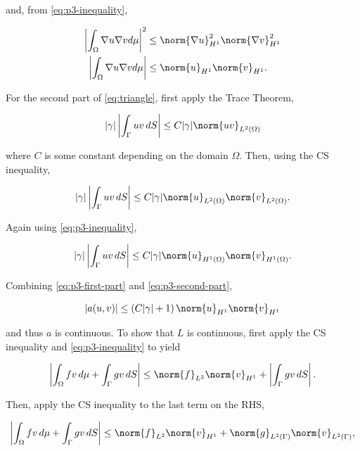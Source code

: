 \documentclass{hw-template}
\newcommand{\intOm}{\int_{\Omega}}
\newcommand{\hOne}{{H^1}}
\newcommand{\ltwo}{{L^2}}
\begin{document}
and, from \autoref{eq:p3-inequality},

\begin{align}
    \left|\intOm \nabla u \nabla v d\mu  \right|^2 &\leq \norm{\nabla u }^2_\hOne \norm{\nabla v}^2_\hOne\\
    \left|\intOm \nabla u \nabla v d\mu  \right| &\leq \norm{ u }_\hOne \norm{ v}_\hOne.\label{eq:p3-first-part}
\end{align}

For the second part of \autoref{eq:triangle}, first apply the Trace Theorem,

\begin{equation}
    |\gamma|\left|\int_{\Gamma}   uv\, dS \right| \leq C |\gamma|\norm{uv}_{\ltwo(\Omega)}
\end{equation}

where $C$ is some constant depending on the domain $\Omega$. Then, using the CS inequality,

\begin{equation}
    |\gamma|\left|\int_{\Gamma}   uv\, dS \right| \leq C |\gamma|\norm{u}_{\ltwo(\Omega)}\norm{v}_{\ltwo(\Omega)}.
\end{equation}

Again using \autoref{eq:p3-inequality},

\begin{equation}
    |\gamma|\left|\int_{\Gamma}   uv\, dS \right| \leq C |\gamma|\norm{u}_{\hOne(\Omega)}\norm{v}_{\hOne(\Omega)}.\label{eq:p3-second-part}
\end{equation}



Combining \autoref{eq:p3-first-part} and \autoref{eq:p3-second-part},

\begin{equation}
    |a(u, v)| \leq \left(C|\gamma| + 1 \right) \norm{u}_\hOne \norm{ v}_\hOne
\end{equation}

and thus $a$ is continuous. To show that $L$ is continuous, first apply the CS inequality and \autoref{eq:p3-inequality} to yield

\begin{equation}
    \left|\intOm fv\, d\mu + \int_{\Gamma} gv \, dS\right| \leq  \norm{f}_\ltwo \norm{v}_\hOne + \left|\int_{\Gamma} gv \, dS\right|.
\end{equation}

Then, apply the CS inequality to the last term on the RHS,

\begin{equation}
    \left|\intOm fv\, d\mu + \int_{\Gamma} gv \, dS\right| \leq  \norm{f}_\ltwo \norm{v}_\hOne + \norm{g}_{L^2(\Gamma)}\norm{v}_{L^2(\Gamma)},
\end{equation}
\end{document}
